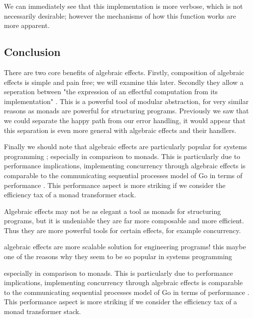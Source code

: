 We can immediately see that this implementation is more verbose,
which is not necessarily desirable;
however the mechanisms of how this function works
are more apparent.

\subsection{Conclusion}
There are two core benefits of algebraic effects.
Firstly, composition of algebraic effects is simple and pain free;
we will examine this later.
Secondly they allow a seperation between
"the expression of an effectful computation from its implementation"
\cite{dolan2015effective}.
This is a powerful tool of modular abstraction,
for very similar reasons as monads are powerful
for structuring programs.
Previously we saw that we could separate the happy path from our error handling,
it would appear that this separation is even more general with algebraic effects
and their handlers.

Finally we should note that
algebraic effects are particularly popular for systems programming
\cite{dolan2015effective, dolan2017concurrent, dolaneffectively};
especially in comparison to monads.
This is particularly due to performance implications,
implementing concurrency through algebraic effects
is comparable to the communicating sequential processes model
of Go in terms of performance \cite{Dolan:2017}.
This performance aspect is more striking
if we consider the efficiency tax of a monad
transformer stack\cite{o2008real}.

Algebraic effects may not be as elegant a tool as monads for structuring programs,
but it is undeniable they are far more composable and more efficient.
Thus they are more powerful tools for certain effects,
for example concurrency.

algebraic effects are more scalable solution for engineering programs!
this maybe one of the reasons why they seem to be so popular in systems
programming

especially in comparison to monads.
This is particularly due to performance implications,
implementing concurrency through algebraic effects
is comparable to the communicating sequential processes model
of Go in terms of performance \cite{Dolan:2017}.
This performance aspect is more striking
if we consider the efficiency tax of a monad
transformer stack\cite{o2008real}.

